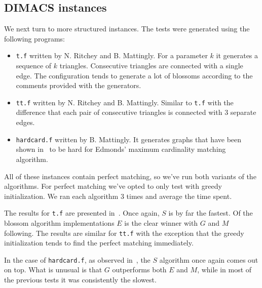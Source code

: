 \subsection{DIMACS instances}

We next turn to more structured instances. The tests were generated using the following programs:

\begin{itemize}
    \item \texttt{t.f} written by N. Ritchey and B. Mattingly. For a parameter $k$ it generates a sequence of $k$ triangles. Consecutive triangles are connected with a single edge. The configuration tends to generate a lot of blossoms according to the comments provided with the generators.
    \item \texttt{tt.f} written by N. Ritchey and B. Mattingly. Similar to \texttt{t.f} with the difference that each pair of consecutive triangles is connected with $3$ separate edges.
    \item \texttt{hardcard.f} written by B. Mattingly. It generates graphs that have been shown in~\cite{gabow1976efficient} to be hard for Edmonds' maximum cardinality matching algorithm.
\end{itemize}

All of these instances contain perfect matching, so we've run both variants of the algorithms. For perfect matching we've opted to only test with greedy initialization. We ran each algorithm $3$ times and average the time spent.

The results for \texttt{t.f} are presented in~. Once again, $S$ is by far the fastest. Of the blossom algorithm implementations $E$ is the clear winner with $G$ and $M$ following. The results are similar for \texttt{tt.f} with the exception that the greedy initialization tends to find the perfect matching immediately. 

In the case of \texttt{hardcard.f}, as observed in~, the $S$ algorithm once again comes out on top. What is unusual is that $G$ outperforms both $E$ and $M$, while in most of the previous tests it was consistently the slowest.

